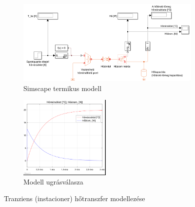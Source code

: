 \begin{figure}[H]
	\begin{subfigure}[t]{\textwidth}
		\centering
		\includegraphics[width=\textwidth]{figures/SimscapeGeneral}
		\caption{Simscape termikus modell}
		\label{fig:SimscapeGeneral}
	\end{subfigure}%
	\smallskip
	\vspace*{10pt}
	\begin{subfigure}[t]{\textwidth}
		\centering
		\includegraphics[trim=2 12 5 0, clip,width=0.49\textwidth]{figures/step_Simscape}
		\caption{Modell ugrásválasza}
		\label{fig:SimscapeStep}
	\end{subfigure}
	\caption{Tranziens (instacioner) hőtranszfer modellezése}
	\label{fig:Simscape}
	\centering
\end{figure}




